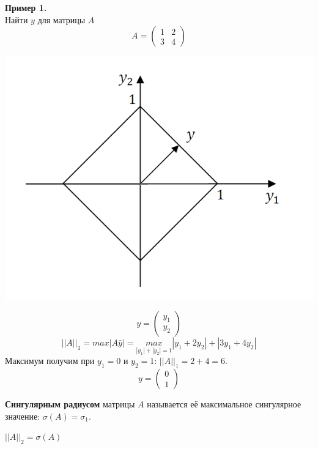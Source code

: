 \textbf{Пример 1.}\\
Найти $y$ для матрицы $A$ \[A=\begin{pmatrix}
1 & 2\\
3 & 4
\end{pmatrix}\]
\begin{center}
    \includegraphics[scale=0.6]{l8_1.png}\end{center}
\[y=\begin{pmatrix}
y_1\\
y_2
\end{pmatrix}\]
$$||A||_1=max|A \bar y|=\underset{|y_1|+|y_2|=1}{max}|y_1+2y_2|+|3y_1+4y_2|$$
Максимум получим при $y_1=0$ и $y_2=1$: $||A||_1=2+4=6$.
\[y=\begin{pmatrix}
0\\
1
\end{pmatrix}\]
\begin{definition}
    \textbf{Сингулярным радиусом} матрицы $A$ называется её максимальное сингулярное значение: $\sigma(A) = \sigma_1$.
\end{definition}
\begin{theorem}
    $||A||_2=\sigma(A)$
\end{theorem}

